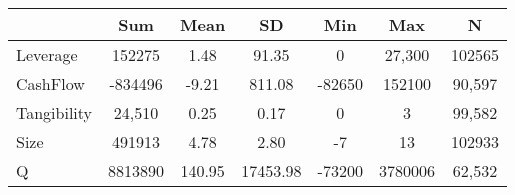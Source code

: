 {
\def\sym#1{\ifmmode^{#1}\else\(^{#1}\)\fi}
\begin{tabular}{l*{1}{cccccc}}
\hline\hline
                    &         Sum&        Mean&          SD&         Min&         Max&           N\\
\hline
Leverage            &      152275&        1.48&       91.35&           0&      27,300&      102565\\
CashFlow            &     -834496&       -9.21&      811.08&      -82650&      152100&      90,597\\
Tangibility         &      24,510&        0.25&        0.17&           0&           3&      99,582\\
Size                &      491913&        4.78&        2.80&          -7&          13&      102933\\
Q                   &     8813890&      140.95&    17453.98&      -73200&     3780006&      62,532\\
\hline\hline
\end{tabular}
}
